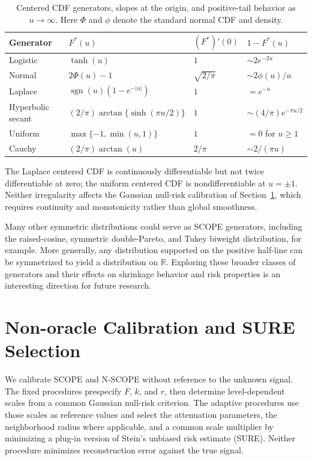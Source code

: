 \documentclass[12pt]{article}
\theoremstyle{definition}
\theoremstyle{definition}
\DeclareMathOperator{\sgn}{sgn}
\begin{document}
\begin{table}[t]
\centering\small
\caption{Centered CDF generators, slopes at the origin, and
positive-tail behavior as $u\to\infty$. Here $\Phi$ and $\phi$ denote
the standard normal CDF and density.}
\label{tab:cdfs}
\begin{tabular}{llll}
\toprule
Generator & $F^*(u)$ & $(F^*)'(0)$ & $1-F^*(u)$ \\
\midrule
Logistic & $\tanh(u)$ & $1$ & $\sim 2e^{-2u}$ \\
Normal & $2\Phi(u)-1$ & $\sqrt{2/\pi}$ & $\sim 2\phi(u)/u$ \\
Laplace & $\sgn(u)(1-e^{-|u|})$ & $1$ & $=e^{-u}$ \\
Hyperbolic secant & $(2/\pi)\arctan\{\sinh(\pi u/2)\}$ & $1$ & $\sim(4/\pi)e^{-\pi u/2}$ \\
Uniform & $\max\{-1,\min(u,1)\}$ & $1$ & $=0$ for $u\ge1$ \\
Cauchy & $(2/\pi)\arctan(u)$ & $2/\pi$ & $\sim2/(\pi u)$ \\
\bottomrule
\end{tabular}
\end{table}

The Laplace centered CDF is continuously differentiable but not
twice differentiable at zero; the uniform centered CDF is
nondifferentiable at $u=\pm1$. Neither irregularity affects the
Gaussian null-risk calibration of Section~\ref{sec:calibration},
which requires continuity and monotonicity rather than global
smoothness.

Many other symmetric distributions could serve as SCOPE generators, including the raised-cosine, symmetric double-Pareto, and Tukey biweight distribution, for example. More generally, any distribution supported on the positive half-line can be symmetrized to yield a distribution on $\mathbb{R}$. Exploring these broader classes of generators and their effects on shrinkage behavior and risk properties is an interesting direction for future research.
\section{Non-oracle Calibration and SURE Selection}
\label{sec:calibration}

We calibrate SCOPE and N-SCOPE without reference to the unknown
signal. The fixed procedures prespecify $F$, $k$, and $r$, then
determine level-dependent scales from a common Gaussian null-risk
criterion. The adaptive procedures use those scales as reference
values and select the attenuation parameters, the neighborhood
radius where applicable, and a common scale multiplier by minimizing
a plug-in version of Stein's unbiased risk estimate (SURE). Neither procedure
minimizes reconstruction error against the true signal.
\end{document}
